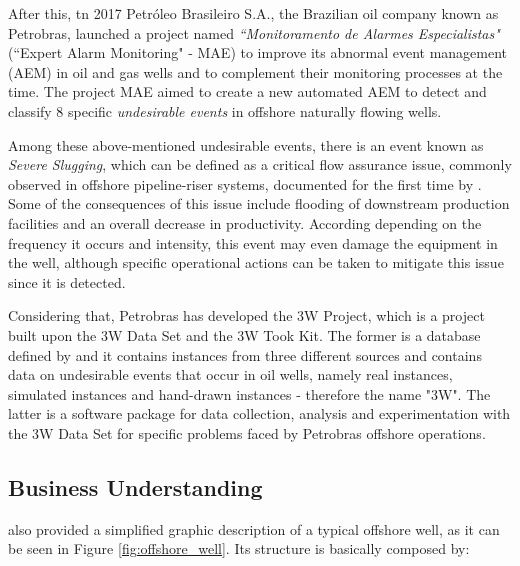\documentclass{article}
\begin{document}
After this, tn 2017 Petróleo Brasileiro S.A., the Brazilian oil company known as Petrobras, launched a project named \emph{“Monitoramento de Alarmes Especialistas"} (“Expert Alarm Monitoring" - MAE) to improve its abnormal event management (AEM) in oil and gas wells and  to complement their monitoring processes at the time. The project MAE aimed to create a new automated AEM to detect and classify 8 specific \emph{undesirable events} in offshore naturally flowing wells.  

Among these above-mentioned undesirable events, there is an event known as \emph{Severe Slugging}, which can be defined as a critical flow assurance issue, commonly observed in offshore pipeline-riser systems, documented for the first time by \textcite{yocum_1973}. Some of the consequences of this issue include flooding of downstream production facilities and an overall decrease in productivity. According \textcite{revvargas2019} depending on the frequency it occurs and intensity, this event may even damage the equipment in the well, although specific operational actions can be taken to mitigate this issue since it is detected.

Considering that, Petrobras has developed the 3W Project, which is a project built upon the 3W Data Set and the 3W Took Kit. The former is a database defined by \textcite{revvargas2019} and it contains instances from three different sources and contains data on undesirable events that occur in oil wells, namely real instances, simulated instances and hand-drawn instances - therefore the name "3W". The latter is a software package for data collection, analysis and experimentation with the 3W Data Set for specific problems faced by Petrobras offshore operations.

\subsection{Business Understanding}

\textcite{revvargas2019} also provided a simplified graphic description of a typical offshore well, as it can be seen in Figure \ref{fig:offshore_well}. Its structure is basically composed by:
\end{document}

